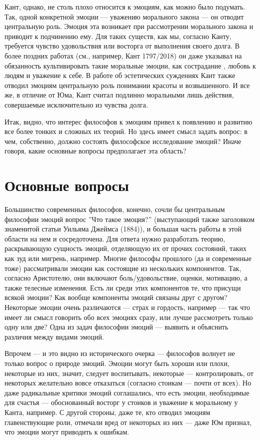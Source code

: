 \documentclass[11pt]{book}
\begin{document}
Кант, однако, не столь плохо относится к эмоциям, как можно было подумать. Так, одной конкретной эмоции --- уважению морального закона --- он отводит центральную роль. Эмоция эта возникает при рассмотрении морального закона и приводит к подчинению ему. Для таких существ, как мы, согласно Канту, требуется чувство удовольствия или восторга от выполнения своего долга. В более поздних работах (см., например, Кант 1797/2018) он даже указывал на обязанность культивировать такие моральные эмоции, как сострадание , любовь к людям и уважение к себе. В работе об эстетических суждениях Кант также отводил эмоциям центральную роль понимании красоты и возвышенного. И все же, в отличие от Юма, Кант считал подлинно моральными лишь действия, совершаемые исключительно из чувства долга.

Итак, видно, что интерес философов к эмоциям привел к появлению и развитию все более тонких и сложных их теорий. Но здесь имеет смысл задать вопрос: в чем, собственно, должно состоять философское исследование эмоций? Иначе говоря, какие основные вопросы предполагает эта область?

\section{Основные вопросы}

Большинство современных философов, конечно, сочли бы центральным философии эмоций вопрос ''Что такое эмоция?'' (выступающий также заголовком знаменитой статьи Уильяма Джеймса (1884)), и большая часть работы в этой области на нем и сосредоточена. Для ответа нужно разработать теорию, раскрывающую сущность эмоций, отделяющую их от прочих состояний, таких как зуд или мигрень, например. Многие философы прошлого (да и современные тоже) рассматривали эмоции как состоящие из нескольких компонентов. Так, согласно Аристотелю, они включают боль/удовольствие, оценки, мотивацию, а также телесные изменения. Есть ли среди этих компонентов те, что присущи всякой эмоции? Как вообще компоненты эмоций связаны друг с другом? Некоторые эмоции очень различаются --- страх и гордость, например --- так что имеет ли смысл говорить обо всех эмоциях сразу, или лучше рассмотреть только одну или две? Одна из задач философии эмоций --- выявить и объяснить различия между видами эмоций.

Впрочем --- и это видно из исторического очерка --- философов волнует не только вопрос о природе эмоций. Эмоции могут быть хороши или плохи, некоторые из них, значит, следует воспитывать, некоторые --- контролировать, от некоторых желательно вовсе отказаться (согласно стоикам --- почти от всех). Но даже радикальные критики эмоций соглашались, что есть эмоции, необходимые для счастья --- обоснованный восторг у стоиков и уважение к моральному у Канта, например. С другой стороны, даже те, кто отводил эмоциям главенствующие роли, отмечали вред от некоторых из них --- даже Юм признал, что эмоции могут приводить к ошибкам.
\end{document}
